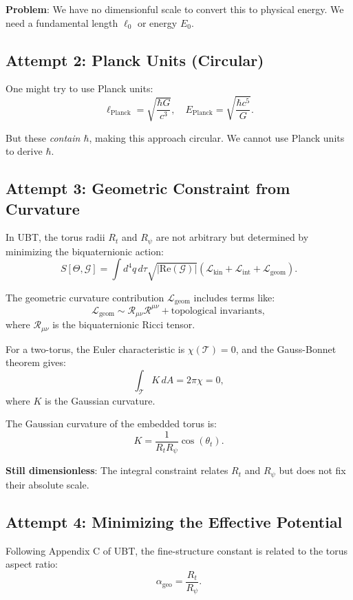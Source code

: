 \documentclass[12pt]{article}
\begin{document}
\textbf{Problem}: We have no dimensionful scale to convert this to physical energy. We need a fundamental length $\ell_0$ or energy $E_0$.

\subsection{Attempt 2: Planck Units (Circular)}

One might try to use Planck units:
\[
\ell_{\text{Planck}} = \sqrt{\frac{\hbar G}{c^3}}, \quad E_{\text{Planck}} = \sqrt{\frac{\hbar c^5}{G}}.
\]

But these \emph{contain $\hbar$}, making this approach circular. We cannot use Planck units to derive $\hbar$.

\subsection{Attempt 3: Geometric Constraint from Curvature}

In UBT, the torus radii $R_t$ and $R_\psi$ are not arbitrary but determined by minimizing the biquaternionic action:
\[
S[\Theta, \mathcal{G}] = \int d^4q \, d\tau \sqrt{|\text{Re}(\mathcal{G})|} \left( \mathcal{L}_{\text{kin}} + \mathcal{L}_{\text{int}} + \mathcal{L}_{\text{geom}} \right).
\]

The geometric curvature contribution $\mathcal{L}_{\text{geom}}$ includes terms like:
\[
\mathcal{L}_{\text{geom}} \sim \mathcal{R}_{\mu\nu} \mathcal{R}^{\mu\nu} + \text{topological invariants},
\]
where $\mathcal{R}_{\mu\nu}$ is the biquaternionic Ricci tensor.

For a two-torus, the Euler characteristic is $\chi(\mathcal{T}) = 0$, and the Gauss-Bonnet theorem gives:
\[
\int_\mathcal{T} K \, dA = 2\pi \chi = 0,
\]
where $K$ is the Gaussian curvature.

The Gaussian curvature of the embedded torus is:
\[
K = \frac{1}{R_t R_\psi} \cos(\theta_t).
\]

\textbf{Still dimensionless}: The integral constraint relates $R_t$ and $R_\psi$ but does not fix their absolute scale.

\subsection{Attempt 4: Minimizing the Effective Potential}

Following Appendix C of UBT, the fine-structure constant is related to the torus aspect ratio:
\[
\alpha_{\text{geo}} = \frac{R_t}{R_\psi}.
\]
\end{document}
